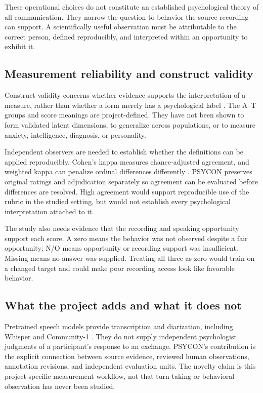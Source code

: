 \documentclass{article}
\begin{document}
These operational choices do not constitute an established psychological theory of all communication. They narrow the question to behavior the source recording can support. A scientifically useful observation must be attributable to the correct person, defined reproducibly, and interpreted within an opportunity to exhibit it.

\subsection{Measurement reliability and construct validity}
Construct validity concerns whether evidence supports the interpretation of a measure, rather than whether a form merely has a psychological label \cite{cronbach1955}. The A--T groups and score meanings are project-defined. They have not been shown to form validated latent dimensions, to generalize across populations, or to measure anxiety, intelligence, diagnosis, or personality.

Independent observers are needed to establish whether the definitions can be applied reproducibly. Cohen's kappa measures chance-adjusted agreement, and weighted kappa can penalize ordinal differences differently \cite{cohen1960,cohen1968}. PSYCON preserves original ratings and adjudication separately so agreement can be evaluated before differences are resolved. High agreement would support reproducible use of the rubric in the studied setting, but would not establish every psychological interpretation attached to it.

The study also needs evidence that the recording and speaking opportunity support each score. A zero means the behavior was not observed despite a fair opportunity; N/O means opportunity or recording support was insufficient. Missing means no answer was supplied. Treating all three as zero would train on a changed target and could make poor recording access look like favorable behavior.

\subsection{What the project adds and what it does not}
Pretrained speech models provide transcription and diarization, including Whisper and Community-1 \cite{radford2022,community1}. They do not supply independent psychologist judgments of a participant's response to an exchange. PSYCON's contribution is the explicit connection between source evidence, reviewed human observations, annotation revisions, and independent evaluation units. The novelty claim is this project-specific measurement workflow, not that turn-taking or behavioral observation has never been studied.
\end{document}
